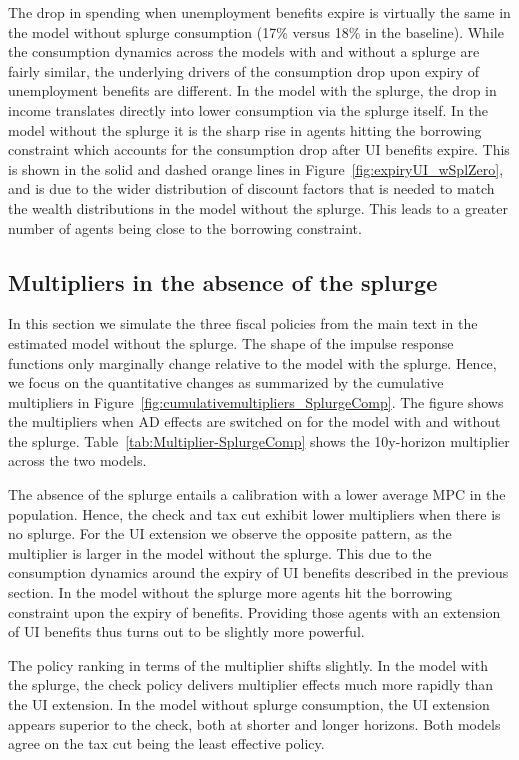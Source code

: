 \documentclass[\latexroot/\projectname]{subfiles}
\begin{document}
The drop in spending when unemployment benefits expire is virtually the same in the model without splurge consumption (17\% versus 18\% in the baseline).
While the consumption dynamics across the models with and without a splurge are fairly similar, the underlying drivers of the consumption drop upon expiry of unemployment benefits are different.
In the model with the splurge, the drop in income translates directly into lower consumption via the splurge itself.
In the model without the splurge it is the sharp rise in agents hitting the borrowing constraint which accounts for the consumption drop after UI benefits expire.
This is shown in the solid and dashed orange lines in Figure~\ref{fig:expiryUI_wSplZero}, and is due to the wider distribution of discount factors that is needed to match the wealth distributions in the model without the splurge. This leads to a greater number of agents being close to the borrowing constraint.



\subsection{Multipliers in the absence of the splurge}
\whenintegrated{\label{app:nosplurge-multipliers}} %

In this section we simulate the three fiscal policies from the main text in the estimated model without the splurge. The shape of the impulse response functions only marginally change relative to the model with the splurge. Hence, we focus on the quantitative changes as summarized by the cumulative multipliers in Figure~\ref{fig:cumulativemultipliers_SplurgeComp}.
The figure shows the multipliers when AD effects are switched on for the model with and without the splurge.
Table~\ref{tab:Multiplier-SplurgeComp} shows the 10y-horizon multiplier across the two models.

The absence of the splurge entails a calibration with a lower average MPC in the population.
Hence, the check and tax cut exhibit lower multipliers when there is no splurge.
For the UI extension we observe the opposite pattern, as the multiplier is larger in the model without the splurge.
This due to the consumption dynamics around the expiry of UI benefits described in the previous section.
In the model without the splurge more agents hit the borrowing constraint upon the expiry of benefits.
Providing those agents with an extension of UI benefits thus turns out to be slightly more powerful.

The policy ranking in terms of the multiplier shifts slightly.
In the model with the splurge, the check policy delivers multiplier effects much more rapidly than the UI extension.
In the model without splurge consumption, the UI extension appears superior to the check, both at shorter and longer horizons.
Both models agree on the tax cut being the least effective policy.





\FloatBarrier

\smartbib
\end{document}

